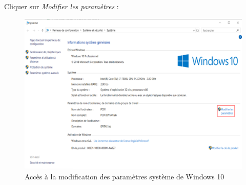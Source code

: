 \newpage
Cliquer sur \textit{Modifier les paramètres} :
\begin{figure}[h!]
	\begin{center}
		\includegraphics[scale=0.7]{W_Screenshots/48.png}
		\caption{Accès à la modification des paramètres système de Windows 10}
		\label{W_Screenshots/48}
	\end{center}
\end{figure}
\FloatBarrier

